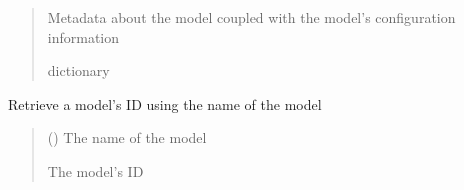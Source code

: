 \documentclass[letterpaper,10pt,english]{sphinxmanual}
\begin{document}
\begin{fulllineitems}
\begin{fulllineitems}
\begin{quote}
\begin{description}
\begin{itemize}
\end{itemize}

\sphinxAtStartPar
{} \textendash{} Metadata about the model coupled with the model’s configuration information

\sphinxAtStartPar
dictionary

\end{description}\end{quote}

\end{fulllineitems}


\begin{fulllineitems}
\label{\detokenize{aisquared.platform:aisquared.platform.AISquaredPlatformClient.AISquaredPlatformClient.get_model_id_by_name}}
\pysigstartsignatures
{}
\pysigstopsignatures
\sphinxAtStartPar
Retrieve a model’s ID using the name of the model

\begin{sphinxVerbatim}[commandchars=\\\{\}]
 
  
\end{sphinxVerbatim}
\begin{quote}\begin{description}
\sphinxAtStartPar
{} () \textendash{} The name of the model

\sphinxAtStartPar
{} \textendash{} The model’s ID


\end{description}
\end{quote}
\end{fulllineitems}
\end{fulllineitems}
\end{document}
